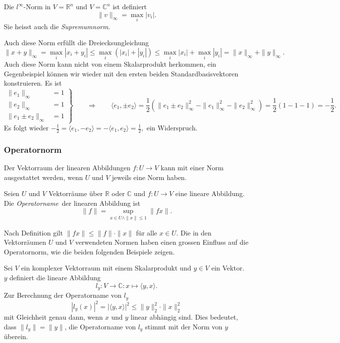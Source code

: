 \begin{definition}
Die $l^\infty$-Norm in $V=\mathbb{R}^n$ und $V=\mathbb{C}^n$ ist definiert
\[
\|v\|_\infty
=
\max_{i} |v_i|.
\]
Sie heisst auch die {\em Supremumnorm}.
%
\end{definition}

Auch diese Norm  erfüllt die Dreiecksungleichung
\[
\|x+y\|_\infty
=
\max_i |x_i+y_i|
\le
\max_i (|x_i| + |y_i|)
\le
\max_i |x_i| + \max_i |y_i|
=
\|x\|_\infty + \|y\|_\infty.
\]
Auch diese Norm kann nicht von einem Skalarprodukt herkommen, ein
Gegenbeispiel können wir wieder mit den ersten beiden Standardbasisvektoren
konstruieren.
Es ist
\[
\left.
\begin{aligned}
\|e_1\|_\infty &= 1\\
\|e_2\|_\infty &= 1\\
\|e_1\pm e_2\|_\infty &= 1
\end{aligned}
\right\}
\qquad\Rightarrow\qquad
\langle e_1,\pm e_2\rangle
=
\frac12(\|e_1\pm e_2\|_\infty^2 - \|e_1\|_\infty^2 - \|e_2\|_\infty^2)
=
\frac12(1-1-1) = -\frac12.
\]
Es folgt wieder
\(
-\frac12
=
\langle e_1,-e_2\rangle
=
-\langle e_1,e_2\rangle
=
\frac12,
\)
ein Widerspruch.

\subsubsection{Operatornorm}
Der Vektorraum der linearen Abbildungen $f\colon U\to V$ kann mit einer
Norm ausgestattet werden, wenn $U$ und $V$ jeweils eine Norm haben.

\begin{definition}
Seien $U$ und $V$ Vektorräume über $\mathbb{R}$ oder $\mathbb{C}$ und
$f\colon U\to V$ eine lineare Abbildung.
Die {\em Operatorname} der linearen Abbildung ist 
\[
\|f\|
=
\sup_{x\in U\wedge \|x\|\le 1} \|fx\|.
\]
\end{definition}

Nach Definition gilt $\|fx\| \le \|f\|\cdot \|x\|$ für alle $x\in U$.
Die in den Vektorräumen $U$ und $V$ verwendeten Normen haben einen
grossen Einfluss auf die Operatornorm, wie die beiden folgenden
Beispiele zeigen.

\begin{beispiel}
Sei $V$ ein komplexer Vektorraum mit einem Skalarprodukt und $y\in V$ ein
Vektor.
$y$ definiert die lineare Abbildung
\[
l_y
\colon
V\to \mathbb{C}: x\mapsto \langle y,x\rangle.
\]
Zur Berechnung der Operatorname von $l_y$ 
\[
|l_y(x)|^2
=
|\langle y,x\rangle|^2
\le
\|y\|_2^2\cdot \|x\|_2^2
\]
mit Gleichheit genau dann, wenn $x$ und $y$ linear abhängig sind.
Dies bedeutet, dass
$\|l_y\|=\|y\|$, die Operatorname von $l_y$ stimmt mit der Norm von $y$
überein.
\end{beispiel}

